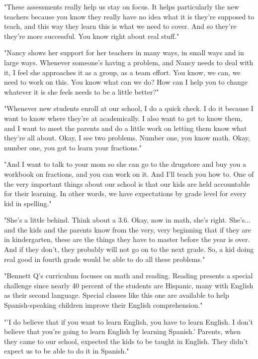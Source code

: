"These assessments really help us stay on focus. It helps particularly the new teachers because you know they really have no idea what it is they're supposed to teach, and this way they learn this is what we need to cover. And so they're they're more successful. You know right about real stuff."

"Nancy shows her support for her teachers in many ways, in small ways and in large ways. Whenever someone's having a problem, and Nancy needs to deal with it, I feel she approaches it as a group, as a team effort. You know, we can, we need to work on this. You know what can we do? How can I help you to change whatever it is she feels needs to be a little better?"

"Whenever new students enroll at our school, I do a quick check. I do it because I want to know where they're at academically. I also want to get to know them, and I want to meet the parents and do a little work on letting them know what they're all about. Okay, I see two problems. Number one, you know math. Okay, number one, you got to learn your fractions."

"And I want to talk to your mom so she can go to the drugstore and buy you a workbook on fractions, and you can work on it. And I'll teach you how to. One of the very important things about our school is that our kids are held accountable for their learning. In other words, we have expectations by grade level for every kid in spelling."

"She's a little behind. Think about a 3.6. Okay, now in math, she's right. She's... and the kids and the parents know from the very, very beginning that if they are in kindergarten, these are the things they have to master before the year is over. And if they don't, they probably will not go on to the next grade. So, a kid doing real good in fourth grade would be able to do all these problems."

"Bennett Q's curriculum focuses on math and reading. Reading presents a special challenge since nearly 40 percent of the students are Hispanic, many with English as their second language. Special classes like this one are available to help Spanish-speaking children improve their English comprehension."

"'I do believe that if you want to learn English, you have to learn English. I don't believe that you're going to learn English by learning Spanish.' Parents, when they came to our school, expected the kids to be taught in English. They didn't expect us to be able to do it in Spanish."

